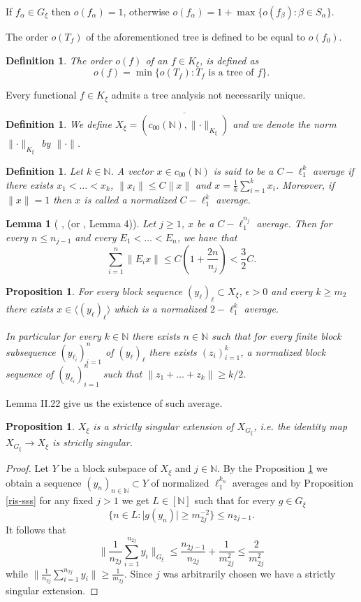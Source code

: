 \documentclass[a4paper]{amsart}
\theoremstyle{plain}
\newtheorem{lemma}[theorem]{Lemma}
\newtheorem{proposition}[theorem]{Proposition}
\newtheorem{definition}[theorem]{Definition}
\newcommand{\N}{\mathbb{N}}
\newcommand{\e}{\epsilon}
\newcommand{\fa}{f_{\alpha}}
\newcommand{\fb}{f_{\beta}}
\newcommand{\norm}[1][\cdot]{\lVert #1\rVert}
\newcommand{\xn}[1][x]{(#1_{n})_{n\in\N}}
\begin{document}
If $\fa\in G_{\xi}$ then $o(\fa) = 1$, otherwise $o(\fa)=1 + \max\{o(\fb):\beta \in S_{\alpha}\}$.

The order $o(T_{f})$ of the aforementioned tree is defined to be equal to $o(f_0)$.
\begin{definition} The order $o(f)$ of an $f \in K_{\xi}$, is defined as
                   $$o(f )=\min\{o(T_f ) :\text{$T_{f}$ is a tree of $f$}\}.$$
\end{definition}

Every functional $f\in K_{\xi}$  admits a tree analysis not necessarily unique.
\begin{definition} We define $X_\xi=\overline{(c_{00}(\N),\norm_{K_{\xi}})}$ 
and we   denote the norm $\norm_{K_{\xi}}$ by $\norm$.
\end{definition}
\begin{definition}
 Let $k\in\mathbb{N}$. A vector $x\in c_{00}(\N)$ is said to be
 a $C-\ell_{1}^{k}$ average if there
 exists $x_{1}<\ldots<x_{k}$, $\norm[x_{i}]\leq C\norm[x]$ and
 $x=\frac{1}{k}\sum_{i=1}^{k}x_{i}$. Moreover, if $\norm[x]=1$ then
 $x$ is called a normalized $C-\ell_{1}^{k}$ average.
\end{definition}
\begin{lemma}[ \cite{Sh}, (or \cite{GM}, Lemma 4)] \label{l4.5}
Let $j\geq 1$, $x$ be a $C-\ell_{1}^{n_{j}}$ average.  Then for
every $n\leq n_{j-1}$ and
 every
 $E_{1}<\ldots<E_{n}$,
we have that $$ \sum_{i=1}^{n}\norm[E_{i}x]\leq
C(1+\frac{2n}{n_{j}})
 <\frac{3}{2}C. $$
\end{lemma}
\begin{proposition}\label{p4.6}
For every block sequence $(y_{\ell})_{\ell}\subset X_\xi$, $\e>0$ and every $k\ge m_2$
there exists $x\in\langle (y_{\ell})_{\ell}\rangle$ which is a normalized $2-\ell_{1}^k$
average.

In particular for every $k\in\N$ there exists $n\in\N$ such that  for every finite block subsequence $(y_{\ell_{i}})_{i=1}^{n}$ of $(y_{\ell})_{\ell}$ there exists $(z_{i})_{i=1}^{k}$, a normalized block sequence of $(y_{\ell_i})_{i=1}^{n}$ such that $\norm[z_1+\dots+z_k]\geq k/2$.
\end{proposition}
Lemma II.22 \cite{ATod}
give us the existence of such average.
\begin{proposition}\label{ss}
$X_\xi$ is a strictly singular extension of $X_{G_{\xi}}$, i.e. the identity map
$X_{G_\xi}\to X_\xi$ is strictly singular.
\end{proposition}
\begin{proof}
Let $Y$ be a block subspace of  $X_\xi$ and $j\in\N$. By the Proposition \ref{p4.6} we
obtain a sequence $\xn[y]\subset Y$ of normalized $\ell_{1}^{k_n}$ averages and by
Proposition \ref{ris-sss} for any fixed $j>1$ we get $L\in [\N]$ such that for every
$g\in G_{\xi}$
$$
\{n\in L: \vert g(y_n)\vert\geq m_{2j}^{-2}\}\leq n_{2j-1}.
$$
 It follows that
$$
\|\frac{1}{n_{2j}}\sum_{i=1}^{n_{2j}}y_{i}\|_{G_{\xi}}
 \leq
\frac{n_{2j-1}}{n_{2j}}+\frac{1}{m_{2j}^2}\leq \frac{2}{m_{2j}^{2}}
$$
 while
$\norm[\frac{1}{n_{2j}}\sum_{i=1}^{n_{2j}}y_{i}] \geq \frac{1}{m_{2j}}$. Since $j$ was
arbitrarily chosen we have a strictly singular extension.
\end{proof}
\end{document}
